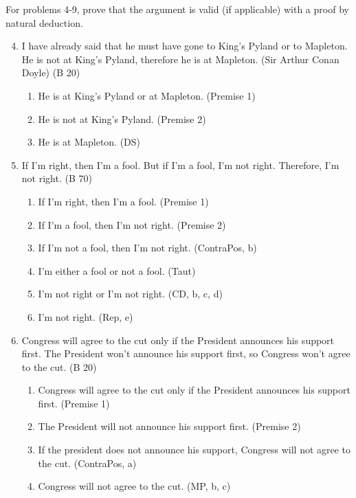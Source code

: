 \documentclass{article}
\begin{document}
\begin{flushleft}
    For problems 4-9, prove that the argument is valid (if applicable) with a proof by natural deduction.
\end{flushleft}
\begin{enumerate}
    \setcounter{enumi}{3}
    \item I have already said that he must have gone to King's Pyland or to Mapleton. He is not at King's Pyland, therefore he is at Mapleton. (Sir Arthur Conan Doyle) (B 20)
          \begin{enumerate}
              \item He is at King's Pyland or at Mapleton. (Premise 1)
              \item He is not at King's Pyland. (Premise 2)
              \item He is at Mapleton. (DS)
          \end{enumerate}
    \item If I'm right, then I'm a fool. But if I'm a fool, I'm not right. Therefore, I'm not right. (B 70)
          \begin{enumerate}
              \item If I'm right, then I'm a fool. (Premise 1)
              \item If I'm a fool, then I'm not right. (Premise 2)
              \item If I'm not a fool, then I'm not right. (ContraPos, b)
              \item I'm either a fool or not a fool. (Taut)
              \item I'm not right or I'm not right. (CD, b, c, d)
              \item I'm not right. (Rep, e)
          \end{enumerate}
    \item Congress will agree to the cut only if the President announces his support first. The President won't announce his support first, so Congress won't agree to the cut. (B 20)
          \begin{enumerate}
              \item Congress will agree to the cut only if the President announces his support first. (Premise 1)
              \item The President will not announce his support first. (Premise 2)
              \item If the president does not announce his support, Congress will not agree to the cut. (ContraPos, a)
              \item Congress will not agree to the cut. (MP, b, c)

\end{enumerate}
\end{enumerate}
\end{document}
